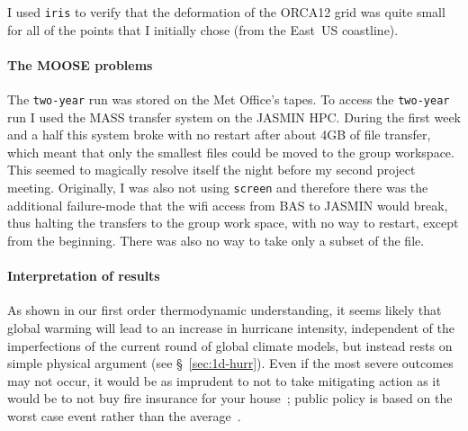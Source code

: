 I used \texttt{iris} to verify that the deformation of the ORCA12 grid was quite small
for all of the points that I initially chose (from the East~US coastline).

\paragraph{The MOOSE problems}

The \texttt{two-year} run was stored on the
Met Office's tapes.
To access the \texttt{two-year} run I used the
MASS transfer system on the JASMIN HPC.
During the first week and a half this system broke
with no restart after about 4GB of file transfer,
which meant that only the smallest files could be
moved to the group workspace. This seemed to magically resolve
itself the night before my second project meeting.
Originally, I was also not using \texttt{screen}
and therefore there was the additional failure-mode
that the wifi access from BAS to JASMIN would break,
thus halting the transfers to the group work space,
with no way to restart, except from the beginning.
There was also no way to take only a subset of the file.

\paragraph{Interpretation of results}
As shown in our first order thermodynamic understanding, it seems likely that
global warming will lead to an increase in hurricane intensity, independent
of the imperfections of the current round of global climate models,
but instead rests on simple physical argument (see §~\ref{sec:1d-hurr}).
Even if the most severe outcomes may not occur,
it would be as imprudent to not to take mitigating action as it would be
to not buy fire insurance for your house~\cite{emanuel2005divine};
public policy is based on the worst case event rather than the average~\cite{taleb2020statistical}.
